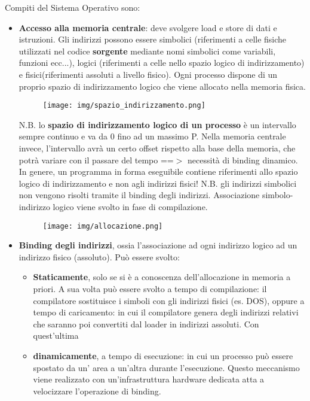\documentclass{article}
\begin{document}
\noindent Compiti del Sistema Operativo sono:
\begin{itemize}
    \item \textbf{Accesso alla memoria centrale}: deve svolgere load e store di dati e istruzioni. Gli indirizzi possono essere simbolici 
    (riferimenti a celle fisiche utilizzati nel codice \textbf{sorgente} mediante nomi simbolici come variabili, funzioni ecc...), logici (riferimenti a celle nello spazio logico di indirizzamento) e 
    fisici(riferimenti assoluti a livello fisico). Ogni processo dispone di un proprio spazio di indirizzamento logico che viene allocato nella memoria fisica.
    \medskip

    \begin{figure}[h!]
        \begin{center}
            \texttt{[image: img/spazio\_indirizzamento.png]}     
        \end{center}
    \end{figure}
        
    \noindent N.B. lo \textbf{spazio di indirizzamento logico di un processo} è un intervallo sempre continuo e va da 0 fino ad un massimo P. Nella 
    memoria centrale invece, l'intervallo avrà un certo offset rispetto alla base della memoria, che potrà variare con il passare del tempo ==$>$ necessità di binding dinamico.
    In genere, un programma in forma eseguibile contiene riferimenti allo spazio logico di indirizzamento e non agli indirizzi fisici!
    N.B. gli indirizzi simbolici non vengono risolti tramite il binding degli indirizzi. Associazione simbolo-indirizzo logico viene svolto in fase di compilazione.
    
    \begin{figure}[h!]
        \begin{center}
            \texttt{[image: img/allocazione.png]}     
        \end{center}
    \end{figure}
    
    \item \textbf{Binding degli indirizzi}, ossia l'associazione ad ogni indirizzo logico ad un indirizzo fisico (assoluto). Può essere svolto:
        \begin{itemize}
            \item \textbf{Staticamente}, solo se si è a conoscenza dell'allocazione in memoria a priori. A sua volta può essere svolto a tempo di compilazione: il compilatore
            sostituisce i simboli con gli indirizzi fisici (es. DOS), oppure a tempo di caricamento: in cui il compilatore genera degli
            indirizzi relativi che saranno poi convertiti dal loader in indirizzi assoluti. Con quest'ultima 
            \item  \textbf{dinamicamente}, a tempo di esecuzione: in cui un processo può essere spostato da un' area
            a un'altra durante l'esecuzione. Questo meccanismo viene realizzato con un'infrastruttura hardware dedicata atta a velocizzare l'operazione di binding.
        \end{itemize}


\end{itemize}
\end{document}
